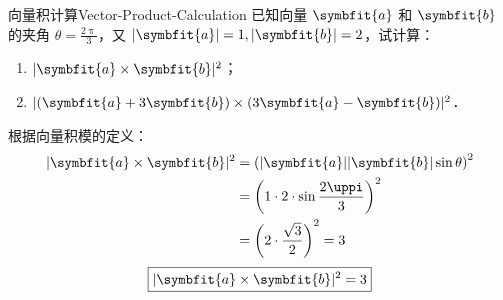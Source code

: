 \begin{problem}{向量积计算}{Vector-Product-Calculation}
    已知向量 $\symbfit{a}$ 和 $\symbfit{b}$ 的夹角 $\theta = \frac{2\uppi}{3}$，又 $|\symbfit{a}| = 1, |\symbfit{b}| = 2$，试计算：
    \begin{enumerate}
        \item $|\symbfit{a} \times \symbfit{b}|^2$；
        \item $|(\symbfit{a} + 3\symbfit{b}) \times (3\symbfit{a} - \symbfit{b})|^2$．
    \end{enumerate}
\end{problem}

\begin{solution}

    根据向量积模的定义：
    \begin{equation}
        \begin{aligned}
            |\symbfit{a} \times \symbfit{b}|^2 & = \left( |\symbfit{a}| |\symbfit{b}| \sin \theta \right)^2 \\
                                               & = \left( 1 \cdot 2 \cdot \sin \frac{2\uppi}{3} \right)^2   \\
                                               & = \left( 2 \cdot \frac{\sqrt{3}}{2} \right)^2 = 3
        \end{aligned}
    \end{equation}
    \begin{equation}
        \boxed{|\symbfit{a} \times \symbfit{b}|^2 = 3}
    \end{equation}



\end{solution}
